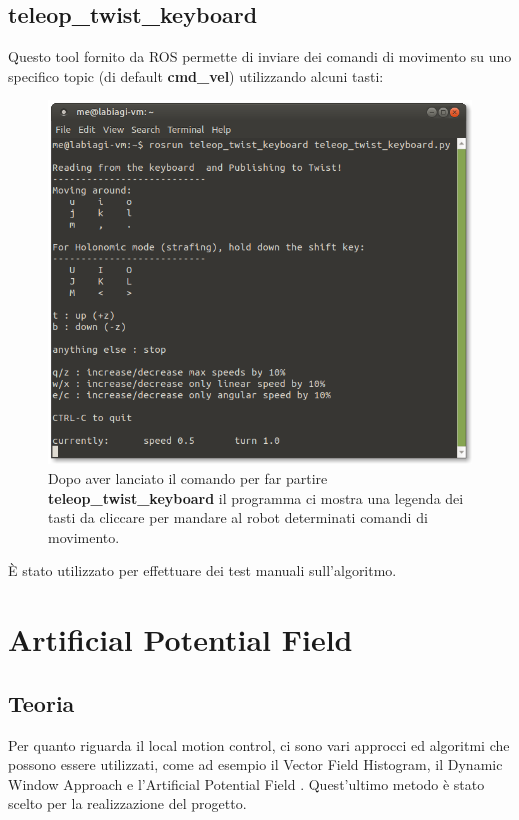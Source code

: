 \documentclass[Lau, binding=0.6cm, oneside]{sapthesis}
\begin{document}
\subsection{teleop\_twist\_keyboard}
Questo tool fornito da ROS permette di inviare dei comandi di movimento su uno specifico topic (di default \textbf{cmd\_vel}) utilizzando alcuni tasti:
\begin{figure}[H]
    \centering
    \includegraphics[width=13cm]{teleop.png}
    \caption{Dopo aver lanciato il comando per far partire \textbf{teleop\_twist\_keyboard} il programma ci mostra una legenda dei tasti da cliccare per mandare al robot determinati comandi di movimento.}
    \label{fig:teleop}
\end{figure}
È stato utilizzato per effettuare dei test manuali sull'algoritmo.

\section{Artificial Potential Field}
\subsection{Teoria}
Per quanto riguarda il local motion control, ci sono vari approcci ed algoritmi che possono essere utilizzati, come ad esempio il Vector Field Histogram, il Dynamic Window Approach e l'Artificial Potential Field \cite{fonte1}.
Quest'ultimo metodo è stato scelto per la realizzazione del progetto.
\end{document}
